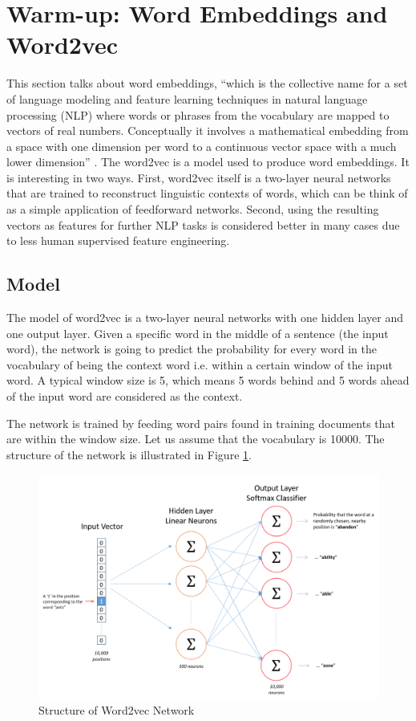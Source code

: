 \documentclass[11pt]{article}
\theoremstyle{plain}
\begin{document}
\section{Warm-up: Word Embeddings and Word2vec}
\label{s:w2v}
This section talks about word embeddings, ``which is the collective name for 
a set of language modeling and feature learning techniques in natural 
language processing (NLP) where words or phrases from the vocabulary are 
mapped to vectors of real numbers. Conceptually it involves a mathematical 
embedding from a space with one dimension per word to a continuous vector 
space with a much lower dimension'' \cite{wiki-wordembedding}. The 
word2vec is a model used to produce word embeddings. It is interesting in 
two ways. First, word2vec itself is a two-layer neural networks that are 
trained to reconstruct linguistic contexts of words, which can be think of as 
a simple application of feedforward networks. Second, using the resulting 
vectors as features for further NLP tasks is considered better in many cases 
due to less human supervised feature engineering. 

\subsection{Model}
The model of word2vec is a two-layer neural networks with one hidden layer 
and one output layer. Given a specific word in the middle of a sentence (the 
input word), the network is going to predict the probability for every word in 
the vocabulary of being the context word i.e. within a certain window of the 
input word. A typical window size is 5, which means 5 words behind and 5 
words ahead of the input word are considered as the context.

The network is trained by feeding word pairs found in training documents 
that are within the window size. Let us assume that the vocabulary is 10000. 
The structure of the network is illustrated in 
Figure \ref{fg:w2v-structure}. 

\begin{figure}[!ht]
	\centering\includegraphics[width=\columnwidth]{images/w2v-structure.png}
	\caption{Structure of Word2vec Network
		\cite{w2v-tutorial}}\label{fg:w2v-structure}
\end{figure}
\end{document}
